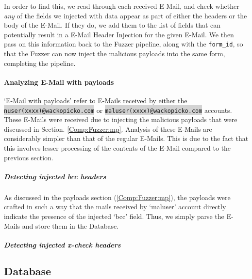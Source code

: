 	In order to find this, we read through each received E-Mail, and check whether \emph{any} of the fields we injected with data appear as part of either the headers or the body of the E-Mail. If they do, we add them to the list of fields that can potentially result in a E-Mail Header Injection for the given E-Mail. We then pass on this information back to the Fuzzer pipeline, along with the \lstinline{form_id}, so that the Fuzzer can now inject the malicious payloads into the same form, completing the pipeline.
	
	\paragraph{Analyzing E-Mail with payloads}
	`E-Mail with payloads' refer to E-Mails received by either the \colorbox{lightgray}{\lstinline{nuser(xxxx)@wackopicko.com}} or \colorbox{lightgray}{\lstinline{maluser(xxxx)@wackopicko.com}} accounts. These E-Mails were received due to injecting the malicious payloads that were discussed in Section. \ref{Comp:Fuzzer:mp}. Analysis of these E-Mails are considerably simpler than that of the regular E-Mails. This is due to the fact that this involves lesser processing of the contents of the E-Mail compared to the previous section.
		\subparagraph{Detecting injected bcc headers}
		As discussed in the payloads section (\ref{Comp:Fuzzer:mp}), the payloads were crafted in such a way that the mails received by `maluser' account directly indicate the presence of the injected `bcc' field. Thus, we simply parse the E-Mails and store them in the Database.
		
		\subparagraph{Detecting injected x-check headers}	
\subsection{Database}
